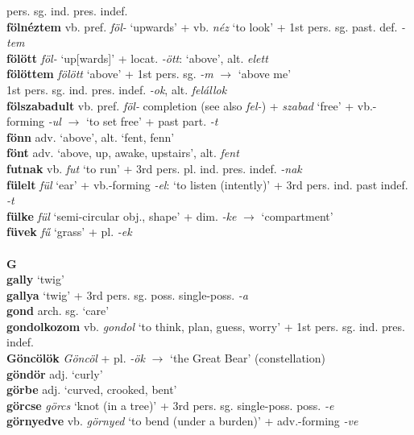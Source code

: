 \documentclass[11pt]{article}
\begin{document}
pers. sg. ind. pres. indef. \\
\textbf{fölnéztem} vb. pref. \emph{föl-} `upwards' + vb.
  \emph{néz} `to look' + 1st pers. sg. past. def. \emph{-tem} \\
\textbf{fölött} \emph{föl-} `up[wards]' +  locat. \emph{-ött}:
`above', alt. \emph{elett} \\
\textbf{fölöttem} \emph{fölött} `above' + 1st pers. sg. \emph{-m}
$\rightarrow$ `above me' \\
1st pers. sg. ind. pres. indef. \emph{-ok}, alt. \emph{felállok} \\
\textbf{fölszabadult} vb. pref. \emph{föl-} completion (see
also \emph{fel-}) + \emph{szabad} `free' + vb.-forming \emph{-ul}
    $\rightarrow$ `to set free' + past part. \emph{-t} \\
\textbf{fönn} adv. `above', alt. `fent, fenn' \\
\textbf{fönt} adv. `above, up, awake, upstairs', alt. \emph{fent} \\
\textbf{futnak} vb. \emph{fut} `to run' + 3rd
pers. pl. ind. pres. indef. \emph{-nak} \\
\textbf{fülelt} \emph{fül} `ear' + vb.-forming \emph{-el}: `to listen
(intently)' + 3rd pers. ind. past indef. \emph{-t} \\
\textbf{fülke} \emph{fül} `semi\hyp{}circular obj., shape' +
dim. \emph{-ke} $\rightarrow$ `compartment' \\
\textbf{füvek} \emph{fű} `grass' + pl. \emph{-ek} \\
\ \\
\noindent \textbf{\large G} \\
\textbf{gally} `twig' \\
\textbf{gallya} `twig' + 3rd pers. sg. poss. single\hyp{}poss. \emph{-a} \\
\textbf{gond} arch. sg. `care' \\
\textbf{gondolkozom} vb. \emph{gondol} `to think, plan, guess, worry'
+ 1st pers. sg. ind. pres. indef. \\
\textbf{Göncölök} \emph{Göncöl} + pl. \emph{-ök} $\rightarrow$ `the Great Bear'
  (constellation) \\
\textbf{göndör} adj. `curly' \\
\textbf{görbe} adj. `curved, crooked, bent' \\
\textbf{görcse} \emph{görcs} `knot (in a tree)' + 3rd
pers. sg. single\hyp{}poss. poss. \emph{-e} \\
\textbf{görnyedve} vb. \emph{görnyed} `to bend (under a burden)' +
adv.\hyp{}forming \emph{-ve} \\
\end{document}
